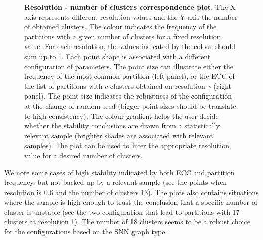 \begin{figure}[H]
    \centering
    \caption{\label{fig:ca-1-kres}\textbf{Resolution - number of clusters correspondence plot.} The X-axis represents different resolution values and the Y-axis the number of obtained clusters. The colour indicates the frequency of the partitions with a given number of clusters for a fixed resolution value. For each resolution, the values indicated by the colour should sum up to 1. Each point shape is associated with a different configuration of parameters. The point size can illustrate either the frequency of the most common partition (left panel), or the ECC of the list of partitions with $c$ clusters obtained on resolution $\gamma$ (right panel). The point size indicates the robustness of the configuration at the change of random seed (bigger point sizes should be translate to high consistency). The colour gradient helps the user decide whether the stability conclusions are drawn from a statistically relevant sample (brighter shades are associated with relevant samples). The plot can be used to infer the appropriate resolution value for a desired number of clusters. }
\end{figure}

We note some cases of high stability indicated by both ECC and partition frequency, but not backed up by a relevant sample (see the points when resolution is 0.6 and the number of clusters 13). The plots also contains situations where the sample is high enough to trust the conclusion that a specific number of cluster is unstable (see the two configuration that lead to partitions with 17 clusters at resolution 1). The number of 18 clusters seems to be a robust choice for the configurations based on the SNN graph type.

